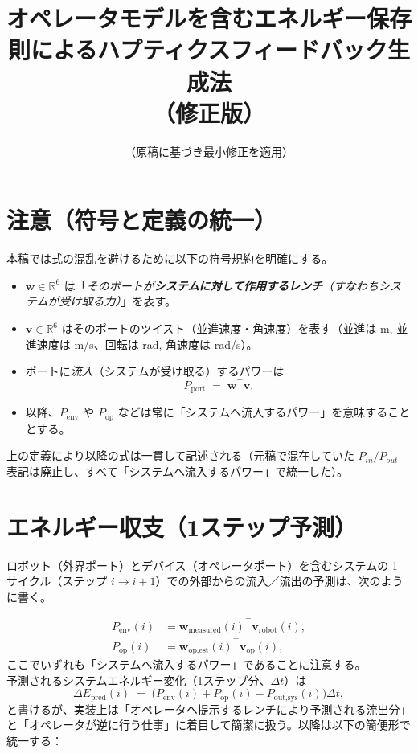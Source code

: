 \documentclass[a4paper,11pt]{article}
\title{オペレータモデルを含むエネルギー保存則によるハプティクスフィードバック生成法 \\（修正版）}
\author{（原稿に基づき最小修正を適用）}
\date{}
\begin{document}
\maketitle

\section*{注意（符号と定義の統一）}
本稿では式の混乱を避けるために以下の符号規約を明確にする。

\begin{itemize}
  \item $\bm{w}\in\mathbb{R}^6$ は「\emph{そのポートが\textbf{システムに対して作用するレンチ}（すなわちシステムが受け取る力）}」を表す。
  \item $\bm{v}\in\mathbb{R}^6$ はそのポートのツイスト（並進速度・角速度）を表す（並進は m, 並進速度は m/s、回転は rad, 角速度は rad/s）。
  \item ポートに\emph{流入}（システムが受け取る）するパワーは
  \[
    P_{\text{port}} \;=\; \bm{w}^\top \bm{v}.
  \]
  \item 以降、$P_{\text{env}}$ や $P_{\text{op}}$ などは常に「システムへ流入するパワー」を意味することとする。
\end{itemize}

上の定義により以降の式は一貫して記述される（元稿で混在していた $P_{in}/P_{out}$ 表記は廃止し、すべて「システムへ流入するパワー」で統一した）。

\section{エネルギー収支（1ステップ予測）}
ロボット（外界ポート）とデバイス（オペレータポート）を含むシステムの 1 サイクル（ステップ $i\to i+1$）での外部からの流入／流出の予測は、次のように書く。

\begin{align}
  P_{\text{env}}(i) &= \bm{w}_{\text{measured}}(i)^\top \bm{v}_{\text{robot}}(i), \\
  P_{\text{op}}(i)  &= \bm{w}_{\text{op,est}}(i)^\top \bm{v}_{\text{op}}(i),
\end{align}
ここでいずれも「システムへ流入するパワー」であることに注意する。\\

予測されるシステムエネルギー変化（1ステップ分、$\Delta t$）は
\[
  \Delta E_{\text{pred}}(i) \;=\; \big( P_{\text{env}}(i) + P_{\text{op}}(i) - P_{\text{out,sys}}(i) \big)\Delta t,
\]
と書けるが、実装上は「オペレータへ提示するレンチにより予測される流出分」と「オペレータが逆に行う仕事」に着目して簡潔に扱う。以降は以下の簡便形で統一する：
\end{document}
